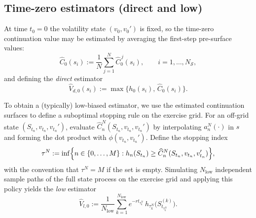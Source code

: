 \documentclass[10pt]{article}
\theoremstyle{plain}
\theoremstyle{definition}
\theoremstyle{remark}
\begin{document}
\subsection{Time-zero estimators (direct and low)}
At time $t_0=0$ the volatility state $(v_0,v_0')$ is fixed, so the time-zero continuation value may be estimated by averaging the first-step
pre-surface values:
\[
\widehat C_0(s_i):=\frac1N\sum_{j=1}^N \widehat C_0^{\,j}(s_i),
\qquad i=1,\dots,N_{\mathcal S},
\]
and defining the \emph{direct} estimator
\[
\widehat V_{d,0}(s_i) := \max\{h_0(s_i),\,\widehat C_0(s_i)\}.
\]


To obtain a (typically) low-biased estimator, we use the estimated continuation surfaces to define a suboptimal stopping rule on the exercise
grid. For an off-grid state $(S_{t_n},v_{t_n},v_{t_n}')$, evaluate $\widehat C_n^{N}(S_{t_n},v_{t_n},v_{t_n}')$ by interpolating $a_n^{N}(\cdot)$
in $s$ and forming the dot product with $\phi(v_{t_n},v_{t_n}')$. Define the stopping index
\[
\tau^{N} := \inf\Bigl\{n\in\{0,\dots,M\}: h_n(S_{t_n}) \ge \widehat C_n^{N}(S_{t_n},v_{t_n},v_{t_n}')\Bigr\},
\]
with the convention that $\tau^{N}=M$ if the set is empty. Simulating $N_{\mathrm{low}}$ independent sample paths of the full state process on
the exercise grid and applying this policy yields the \emph{low} estimator
\[
\widehat V_{l,0} := \frac1{N_{\mathrm{low}}}\sum_{k=1}^{N_{\mathrm{low}}} e^{-r t_{\tau_k^{N}}}\,h_{\tau_k^{N}}\bigl(S_{t_{\tau_k^{N}}}^{(k)}\bigr).
\]
\end{document}
